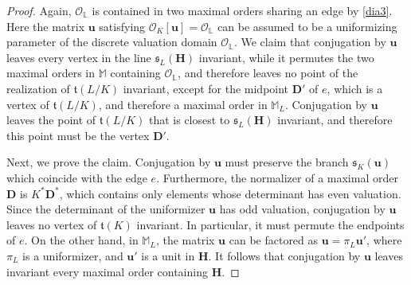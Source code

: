 \documentclass{amsart}
\theoremstyle{definition}
\newcommand\lu{\mathbb{L}}
\newcommand\alge{\mathbb{M}}
\newcommand\oink{\mathcal O}
\newcommand\Da{\mathbf{D}}
\newcommand\Ha{\mathbf{H}}
\begin{document}
\begin{proof}
    Again, $\oink_{\lu}$ is contained in two 
    maximal orders sharing an edge by \ref{dia3}.
    Here the matrix $\mathbf{u}$ satisfying 
    $\oink_K[\mathbf{u}]=
    \oink_{\lu}$ can be assumed to be a uniformizing
    parameter of the discrete valuation domain
    $\oink_{\lu}$. We claim that
    conjugation by $\mathbf{u}$ leaves every vertex in the line
    $\mathfrak{s}_L(\Ha)$ invariant, while it permutes
    the two maximal orders in $\alge $
    containing $\oink_{\lu}$,
    and therefore leaves no point of the realization of
    $\mathfrak{t}(L/K)$ invariant, except for the midpoint 
    $\Da'$ of $e$, which is a vertex of 
    $\mathfrak{t}(L/K)$, and therefore a maximal order
    in $\alge_L$. Conjugation by $\mathbf{u}$ 
    leaves the point of $\mathfrak{t}(L/K)$ that is
    closest to $\mathfrak{s}_L(\Ha)$ invariant, and therefore
    this point must be the vertex $\Da'$. 
    
    Next, we prove the claim. Conjugation by $\mathbf{u}$ must
    preserve the branch $\mathfrak{s}_K(\mathbf{u})$
    which coincide with the edge $e$. Furthermore, the normalizer
    of a maximal order $\Da$ is $K^*\Da^*$, which contains
    only elements whose determinant has even valuation.
    Since the determinant of the uniformizer $\mathbf{u}$
    has odd valuation, conjugation by $\mathbf{u}$ leaves
    no vertex of $\mathfrak{t}(K)$ invariant. In particular,
    it must permute the endpoints of $e$.
    On the other hand, in $\alge_L$, 
    the matrix $\mathbf{u}$
    can be factored as $\mathbf{u}=\pi_L\mathbf{u}'$, 
    where $\pi_L$ is a
    uniformizer, and $\mathbf{u}'$ is a unit in $\Ha$. It follows
    that conjugation by $\mathbf{u}$ leaves invariant every 
    maximal order containing $\Ha$.


\end{proof}
\end{document}

